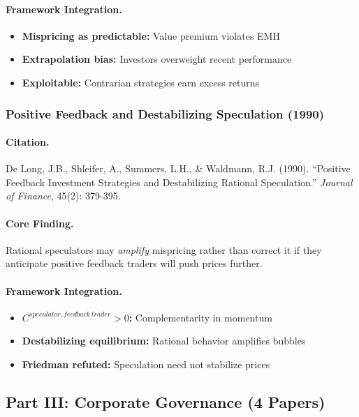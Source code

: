 \paragraph{Framework Integration.}
\begin{itemize}
  \item \textbf{Mispricing as predictable:} Value premium violates EMH
  \item \textbf{Extrapolation bias:} Investors overweight recent performance
  \item \textbf{Exploitable:} Contrarian strategies earn excess returns
\end{itemize}

\subsubsection{Positive Feedback and Destabilizing Speculation (1990)}

\paragraph{Citation.}
De Long, J.B., Shleifer, A., Summers, L.H., \& Waldmann, R.J. (1990).
``Positive Feedback Investment Strategies and Destabilizing Rational Speculation.''
\emph{Journal of Finance}, 45(2): 379-395.

\paragraph{Core Finding.}
Rational speculators may \emph{amplify} mispricing rather than correct it
if they anticipate positive feedback traders will push prices further.

\paragraph{Framework Integration.}
\begin{itemize}
  \item \textbf{$C^{speculator,feedback\ trader} > 0$:} Complementarity in momentum
  \item \textbf{Destabilizing equilibrium:} Rational behavior amplifies bubbles
  \item \textbf{Friedman refuted:} Speculation need not stabilize prices
\end{itemize}

\subsection{Part III: Corporate Governance (4 Papers)}

